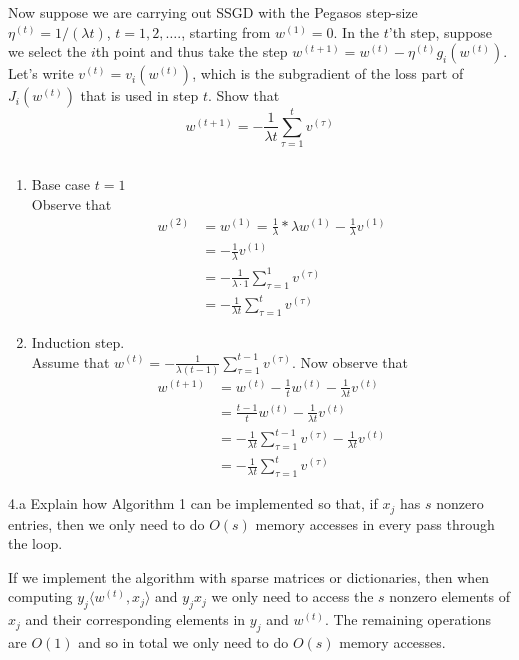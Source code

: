 \documentclass[12pt,letterpaper]{article}
\begin{document}
\begin{problem}{4.3}
Now suppose we are carrying out SSGD with the Pegasos
step-size $\eta^{(t)}=1/\left(\lambda t\right)$, $t=1,2,\ldots$.,
starting from $w^{(1)}=0$. In the $t$'th step, suppose we select
the $i$th point and thus take the step $w^{(t+1)}=w^{(t)}-\eta^{(t)}g_{i}(w^{(t)})$.
Let's write $v^{(t)}=v_{i}(w^{(t)})$, which is the subgradient of
the loss part of $J_{i}(w^{(t)})$ that is used in step $t$. Show
that
\[
w^{(t+1)}=-\frac{1}{\lambda t}\sum_{\tau=1}^{t}v^{(\tau)}
\]
\end{problem}
\begin{solution}{}
$\,$
    \begin{enumerate}
        \item Base case $t=1$\\
            Observe that
            \begin{align*}
                w^{(2)} &= w^{(1)} = \frac{1}{\lambda} * \lambda w^{(1)} - \frac{1}{\lambda} v^{(1)} \\
                &=  - \frac{1}{\lambda} v^{(1)}\\
                &=  - \frac{1}{\lambda \cdot 1} \sum_{\tau=1}^1 v^{(\tau)}\\
                &= - \frac{1}{\lambda t} \sum_{\tau=1}^t v^{(\tau)}
            \end{align*}
        
        \item Induction step.\\
            Assume that $w^{(t)}=-\frac{1}{\lambda (t-1)}\sum_{\tau=1}^{t-1}v^{(\tau)}$. Now observe that
            \begin{align*}
                w^{(t+1)} &= w^{(t)} - \frac{1}{t}w^{(t)} - \frac{1}{\lambda t}v^{(t)}\\
                &= \frac{t-1}{t}w^{(t)} - \frac{1}{\lambda t} v^{(t)}\\
                &= -\frac{1}{\lambda t} \sum_{\tau=1}^{t-1}v^{(\tau)} - \frac{1}{\lambda t}v^{(t)}\\
                &= -\frac{1}{\lambda t} \sum_{\tau=1}^{t}v^{(\tau)}
            \end{align*}
    \end{enumerate}
\end{solution}
\newpage

\begin{problem}{4.a}
Explain how Algorithm 1 can be implemented so that, if
$x_{j}$ has $s$ nonzero entries, then we only need to do $O(s)$
memory accesses in every pass through the loop.
\end{problem}
\begin{solution}{}
    If we implement the algorithm with sparse matrices or dictionaries, then when computing $y_j\langle w^{(t)}, x_j \rangle$
    and $y_jx_j$ we only need to access the $s$ nonzero elements of $x_j$ and their corresponding elements in $y_j$ and $w^{(t)}$.
    The remaining operations are $O(1)$ and so in total we only need to do $O(s)$ memory accesses.
\end{solution}
\newpage
\end{document}
